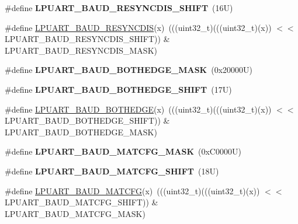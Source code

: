 \begin{DoxyCompactItemize}
\#define {\bfseries L\+P\+U\+A\+R\+T\+\_\+\+B\+A\+U\+D\+\_\+\+R\+E\+S\+Y\+N\+C\+D\+I\+S\+\_\+\+S\+H\+I\+FT}~(16\+U)
\item 
\#define \mbox{\hyperlink{group___l_p_u_a_r_t___register___masks_ga8eddaea4487b6be1a83c8792e110bef5}{L\+P\+U\+A\+R\+T\+\_\+\+B\+A\+U\+D\+\_\+\+R\+E\+S\+Y\+N\+C\+D\+IS}}(x)~(((uint32\+\_\+t)(((uint32\+\_\+t)(x)) $<$$<$ L\+P\+U\+A\+R\+T\+\_\+\+B\+A\+U\+D\+\_\+\+R\+E\+S\+Y\+N\+C\+D\+I\+S\+\_\+\+S\+H\+I\+FT)) \& L\+P\+U\+A\+R\+T\+\_\+\+B\+A\+U\+D\+\_\+\+R\+E\+S\+Y\+N\+C\+D\+I\+S\+\_\+\+M\+A\+SK)
\item 
\mbox{\label{group___l_p_u_a_r_t___register___masks_ga156a0b468b75f5f08936a3c2e362b4e0}} 
\#define {\bfseries L\+P\+U\+A\+R\+T\+\_\+\+B\+A\+U\+D\+\_\+\+B\+O\+T\+H\+E\+D\+G\+E\+\_\+\+M\+A\+SK}~(0x20000\+U)
\item 
\mbox{\label{group___l_p_u_a_r_t___register___masks_ga7b06b54fce5fa2033a7cb768262a3726}} 
\#define {\bfseries L\+P\+U\+A\+R\+T\+\_\+\+B\+A\+U\+D\+\_\+\+B\+O\+T\+H\+E\+D\+G\+E\+\_\+\+S\+H\+I\+FT}~(17\+U)
\item 
\#define \mbox{\hyperlink{group___l_p_u_a_r_t___register___masks_ga2186298ec71137a11206fbbf24ff80dd}{L\+P\+U\+A\+R\+T\+\_\+\+B\+A\+U\+D\+\_\+\+B\+O\+T\+H\+E\+D\+GE}}(x)~(((uint32\+\_\+t)(((uint32\+\_\+t)(x)) $<$$<$ L\+P\+U\+A\+R\+T\+\_\+\+B\+A\+U\+D\+\_\+\+B\+O\+T\+H\+E\+D\+G\+E\+\_\+\+S\+H\+I\+FT)) \& L\+P\+U\+A\+R\+T\+\_\+\+B\+A\+U\+D\+\_\+\+B\+O\+T\+H\+E\+D\+G\+E\+\_\+\+M\+A\+SK)
\item 
\mbox{\label{group___l_p_u_a_r_t___register___masks_ga69b9e9a03f3049414148e29a763a3327}} 
\#define {\bfseries L\+P\+U\+A\+R\+T\+\_\+\+B\+A\+U\+D\+\_\+\+M\+A\+T\+C\+F\+G\+\_\+\+M\+A\+SK}~(0x\+C0000\+U)
\item 
\mbox{\label{group___l_p_u_a_r_t___register___masks_ga2d27b42ee91c7cb1e00ae3ba4479229c}} 
\#define {\bfseries L\+P\+U\+A\+R\+T\+\_\+\+B\+A\+U\+D\+\_\+\+M\+A\+T\+C\+F\+G\+\_\+\+S\+H\+I\+FT}~(18\+U)
\item 
\#define \mbox{\hyperlink{group___l_p_u_a_r_t___register___masks_ga73df6d35c7a168d8505f118fea120190}{L\+P\+U\+A\+R\+T\+\_\+\+B\+A\+U\+D\+\_\+\+M\+A\+T\+C\+FG}}(x)~(((uint32\+\_\+t)(((uint32\+\_\+t)(x)) $<$$<$ L\+P\+U\+A\+R\+T\+\_\+\+B\+A\+U\+D\+\_\+\+M\+A\+T\+C\+F\+G\+\_\+\+S\+H\+I\+FT)) \& L\+P\+U\+A\+R\+T\+\_\+\+B\+A\+U\+D\+\_\+\+M\+A\+T\+C\+F\+G\+\_\+\+M\+A\+SK)
$$
\end{DoxyCompactItemize}

